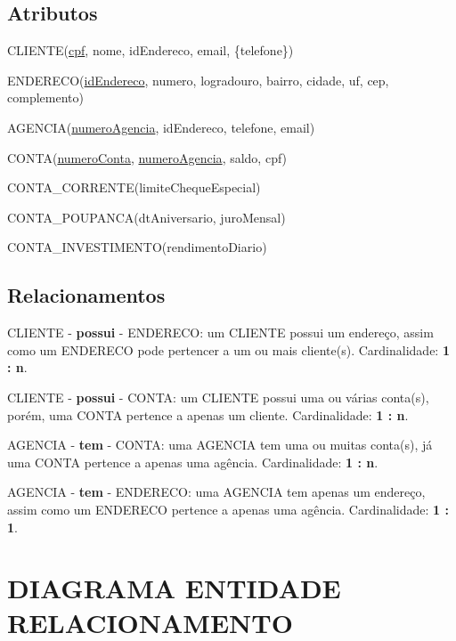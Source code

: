 \documentclass[12pt, a4paper]{article}
\begin{document}
\subsection{Atributos}

\par CLIENTE(\underline{cpf}, nome, idEndereco, email, \{telefone\})
\par ENDERECO(\underline{idEndereco}, numero, logradouro, bairro, cidade, uf, cep, complemento)
\par AGENCIA(\underline{numeroAgencia}, idEndereco, telefone, email)
\par CONTA(\underline{numeroConta}, \underline{numeroAgencia}, saldo, cpf)

\par \hspace{1.5cm} CONTA\_CORRENTE(limiteChequeEspecial)
\par \hspace{1.5cm} CONTA\_POUPANCA(dtAniversario, juroMensal)
\par \hspace{1.5cm} CONTA\_INVESTIMENTO(rendimentoDiario)

\subsection{Relacionamentos}

CLIENTE - \textbf{possui} - ENDERECO: um CLIENTE possui um endereço, assim como um ENDERECO pode pertencer a um ou mais cliente(s). Cardinalidade: \textbf{1 : n}.

CLIENTE - \textbf{possui} - CONTA: um CLIENTE possui uma ou várias conta(s), porém, uma CONTA pertence a apenas um cliente. Cardinalidade: \textbf{1 : n}.

AGENCIA - \textbf{tem} - CONTA: uma AGENCIA tem uma ou muitas conta(s), já uma CONTA pertence a apenas uma agência. Cardinalidade: \textbf{1 : n}.

AGENCIA - \textbf{tem} - ENDERECO: uma AGENCIA tem apenas um endereço, assim como um ENDERECO pertence a apenas uma agência. Cardinalidade: \textbf{1 : 1}.




\section{DIAGRAMA ENTIDADE RELACIONAMENTO}
\end{document}
